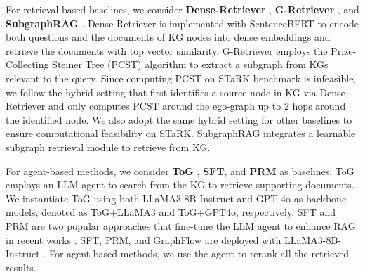For retrieval-based baselines, we consider \textbf{Dense-Retriever} \cite{karpukhin2020dense}, \textbf{G-Retriever} \cite{he2024g}, and \textbf{SubgraphRAG} \cite{liretrieval}.
Dense-Retriever is implemented with SentenceBERT \cite{reimers2019sentence} to encode both questions and the documents of KG nodes into dense embeddings and retrieve the documents with top vector similarity.
G-Retriever employs the Prize-Collecting Steiner Tree (PCST) \cite{archer2011improved} algorithm to extract a subgraph from KGs relevant to the query. 
Since computing PCST on STaRK benchmark is infeasible, we follow the hybrid setting \cite{lee2024hybgrag,lei2025mixture} that first identifies a source node in KG via Dense-Retriever and only computes PCST around the ego-graph up to 2 hops around the identified node.
We also adopt the same hybrid setting for other baselines to ensure computational feasibility on STaRK.
SubgraphRAG integrates a learnable subgraph retrieval module to retrieve from KG.

For agent-based methods, we consider \textbf{ToG} \cite{sunthink}, \textbf{SFT}, and \textbf{PRM} \cite{lightman2023let} as baselines.
ToG employs an LLM agent to search from the KG to retrieve supporting documents. 
We instantiate ToG using both LLaMA3-8B-Instruct and GPT-4o as backbone models, denoted as ToG+LLaMA3 and ToG+GPT4o, respectively.
SFT and PRM are two popular approaches that fine-tune the LLM agent to enhance RAG in recent works \cite{xiong2025rag,dong2025understand,huang2025rag}. SFT, PRM, and GraphFlow are deployed with LLaMA3-8B-Instruct \cite{grattafiori2024llama}.
For agent-based methods, we use the agent to rerank all the retrieved results.

